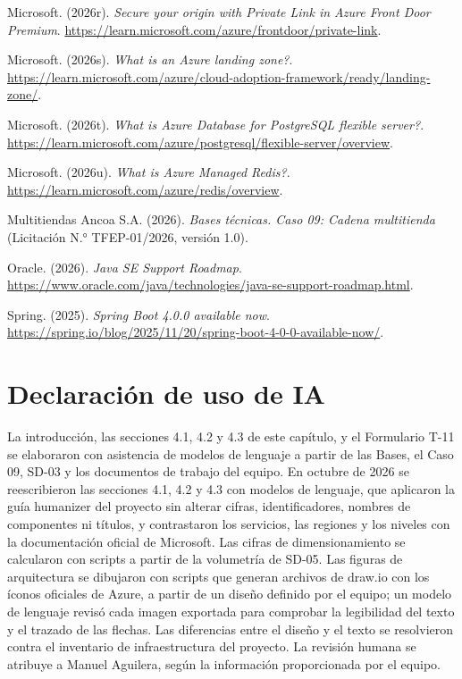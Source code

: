 \documentclass[11pt]{article}
\begin{document}
Microsoft. (2026r). \textit{Secure your origin with Private Link in Azure Front Door Premium}. \url{https://learn.microsoft.com/azure/frontdoor/private-link}.

Microsoft. (2026s). \textit{What is an Azure landing zone?}. \url{https://learn.microsoft.com/azure/cloud-adoption-framework/ready/landing-zone/}.

Microsoft. (2026t). \textit{What is Azure Database for PostgreSQL flexible server?}. \url{https://learn.microsoft.com/azure/postgresql/flexible-server/overview}.

Microsoft. (2026u). \textit{What is Azure Managed Redis?}. \url{https://learn.microsoft.com/azure/redis/overview}.

Multitiendas Ancoa S.A. (2026). \textit{Bases técnicas. Caso 09: Cadena multitienda} (Licitación N.° TFEP-01/2026, versión 1.0).

Oracle. (2026). \textit{Java SE Support Roadmap}. \url{https://www.oracle.com/java/technologies/java-se-support-roadmap.html}.

Spring. (2025). \textit{Spring Boot 4.0.0 available now}. \url{https://spring.io/blog/2025/11/20/spring-boot-4-0-0-available-now/}.

\section*{Declaración de uso de IA}

La introducción, las secciones 4.1, 4.2 y 4.3 de este capítulo, y el Formulario T-11 se elaboraron con asistencia de modelos de lenguaje a partir de las Bases, el Caso 09, SD-03 y los documentos de trabajo del equipo. En octubre de 2026 se reescribieron las secciones 4.1, 4.2 y 4.3 con modelos de lenguaje, que aplicaron la guía humanizer del proyecto sin alterar cifras, identificadores, nombres de componentes ni títulos, y contrastaron los servicios, las regiones y los niveles con la documentación oficial de Microsoft. Las cifras de dimensionamiento se calcularon con scripts a partir de la volumetría de SD-05. Las figuras de arquitectura se dibujaron con scripts que generan archivos de draw.io con los íconos oficiales de Azure, a partir de un diseño definido por el equipo; un modelo de lenguaje revisó cada imagen exportada para comprobar la legibilidad del texto y el trazado de las flechas. Las diferencias entre el diseño y el texto se resolvieron contra el inventario de infraestructura del proyecto. La revisión humana se atribuye a Manuel Aguilera, según la información proporcionada por el equipo.
\end{document}
